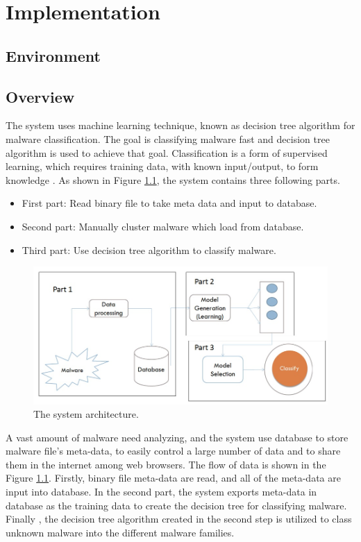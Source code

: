 \chapter{Implementation}\label{chap:5}
%
%
\section{Environment}
\section{Overview}
The system uses machine learning technique, known as decision tree algorithm for malware classification. The goal is classifying malware fast and decision tree algorithm is used to achieve that goal. Classification is a form of supervised learning, which requires training data, with known input/output, to form knowledge \cite{tonylee}. As shown in Figure \ref{fig:system_architec}, the system contains three following parts.

\begin{itemize}
\item First part: Read binary file to take meta data and input to database.
\item Second part: Manually cluster malware which load from database.
\item Third part: Use decision tree algorithm to classify malware.
\end{itemize}
\begin{figure}[h!]
\centering
\includegraphics[width=1\textwidth]
{graph/system_architec1.jpg}
\caption{The system architecture.}
\label{fig:system_architec}
\end{figure}

A vast amount of malware need analyzing, and the system use database to store malware file's meta-data, to easily control a large number of data and to share them in the internet among web browsers.
The flow of data is shown in the Figure \ref{fig:system_architec}. Firstly, binary file meta-data are read, and all of the meta-data are input into database. In the second part, the system exports meta-data in database as the training data to create the decision tree for classifying malware. Finally	, the decision tree algorithm created in the second step is utilized to class  unknown malware into the different malware families. 
%
%
